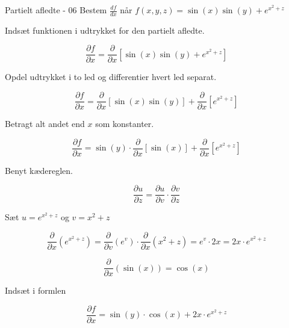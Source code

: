 \documentclass{article}
\begin{document}
\begin{exercise}{Partielt afledte - 06}
	Bestem $\frac{df}{dx}$ når $f(x,y,z) = \sin(x)\sin(y) + e^{x^2+z}$
	
	
	\hint
	Indsæt funktionen i udtrykket for den partielt afledte.
	
	\hint
	
	\[
	\frac{\partial f}{\partial x} = \frac{\partial }{\partial x} \left[  \sin(x)\sin(y) + e^{x^2+z} \right]
	\]
	
	\hint
	Opdel udtrykket i to led og differentier hvert led separat.
	
	\hint
	\[
	\frac{\partial f}{\partial x} = \frac{\partial }{\partial x} \left[  \sin(x)\sin(y)\right] + \frac{\partial }{\partial x} \left[ e^{x^2+z} \right]
	\]
	
	\hint 
	Betragt alt andet end $x$ som konstanter.
	
	\hint
	\[
	\frac{\partial f}{\partial x} = \sin(y) \cdot \frac{\partial }{\partial x} \left[  \sin(x)\right] + \frac{\partial }{\partial x} \left[ e^{x^2+z} \right]
	\]
	
	\hint
	Benyt kædereglen. 
	
	\hint
	\[
	\frac{\partial u}{\partial z} = \frac{\partial u}{\partial v} \cdot \frac{\partial v}{\partial z}
	\]
	
	\hint
	Sæt $u=e^{x^2+z}$ og $v = x^2+z$	
	
	\hint
	\[
	\frac{\partial}{\partial x} \left( e^{x^2+z}\right) = \frac{\partial}{\partial v} \left( e^{v} \right) \cdot \frac{\partial}{\partial x} (x^2+z) = e^{v} \cdot 2x = 2x \cdot e^{x^2+z}
	\]
	
	\hint
	\[
	\frac{\partial}{\partial x} \left(\sin(x) \right) = \cos(x)
	\]
	
	\hint
	Indsæt i formlen
	
	\hint
	\[
	\frac{\partial f}{\partial x} = \sin(y) \cdot \cos(x) +2x\cdot e^{x^2+z}
	\]
	
	
	
	
\end{exercise}

\newpage
\end{document}
